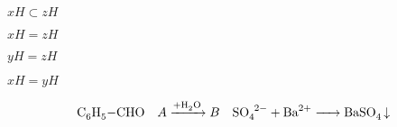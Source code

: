 \documentclass[10pt]{book}
\begin{document}
\begin{mdSnippets}
\begin{mdInlineSnippet}[54a1e5e3d9fa2bd1f31f88514f376c02]
$xH \subset zH$\end{mdInlineSnippet}%
\begin{mdInlineSnippet}[f09ac0263e2e4244804c4a0ec1bc9043]%
$xH = zH$\end{mdInlineSnippet}%
\begin{mdInlineSnippet}%
$yH = zH$\end{mdInlineSnippet}%
\begin{mdInlineSnippet}%
$xH = yH$\end{mdInlineSnippet}%
\begin{mdDisplaySnippet}[34d6c2c3f8f56454e306a51ccd153b33]%
\[\ce{C6H5-CHO}\quad
\ce{$A$ ->[\ce{+H2O}] $B$}\quad
\ce{SO4^2- + Ba^2+ -> BaSO4 v}
\]%
\end{mdDisplaySnippet}%

\end{mdSnippets}
\end{document}
